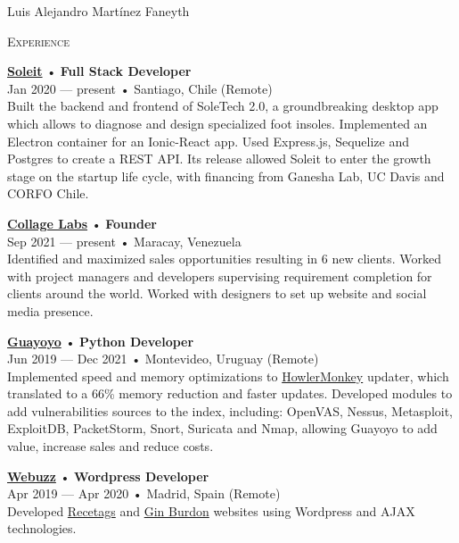 \documentclass[12pt]{article}
\begin{document}
\begin{cv}{Luis Alejandro Mart\'inez Faneyth}
\begin{minipage}[t]{0.55\textwidth}
    \textrm{\textsc{\Large{Experience}}}
    \newline
    \parbox[t]{\linewidth}{
      \textbf{\href{http://soleit.app}{Soleit}} • \textrm{\textbf{Full Stack Developer}}\\
      Jan 2020 --- present • Santiago, Chile (Remote)\\
      \footnotesize{Built the backend and frontend of SoleTech 2.0, a groundbreaking desktop app which allows to diagnose and design specialized foot insoles. Implemented an Electron container for an Ionic-React app. Used Express.js, Sequelize and Postgres to create a REST API. Its release allowed Soleit to enter the growth stage on the startup life cycle, with financing from Ganesha Lab, UC Davis and CORFO Chile.}\\
    }\vspace{0.125em}
    \parbox[t]{\linewidth}{
      \textbf{\href{http://collagelabs.org}{Collage Labs}} • \textrm{\textbf{Founder}}\\
      Sep 2021 --- present • Maracay, Venezuela\\
      \footnotesize{Identified and maximized sales opportunities resulting in 6 new clients. Worked with project managers and developers supervising requirement completion for clients around the world. Worked with designers to set up website and social media presence.}\\
    }\vspace{0.125em}
    \parbox[t]{\linewidth}{
      \textbf{\href{https://guayoyo.io}{Guayoyo}} • \textrm{\textbf{Python Developer}}\\
      Jun 2019 --- Dec 2021 • Montevideo, Uruguay (Remote)\\
      \footnotesize{Implemented speed and memory optimizations to \href{https://howlermonkey.io}{HowlerMonkey} updater, which translated to a 66\% memory reduction and faster updates. Developed modules to add vulnerabilities sources to the index, including: OpenVAS, Nessus, Metasploit, ExploitDB, PacketStorm, Snort, Suricata and Nmap, allowing Guayoyo to add value, increase sales and reduce costs.}\\
    }\vspace{0.125em}
    \parbox[t]{\linewidth}{
      \textbf{\href{https://web.archive.org/web/20180413143616/https://webuzz.es/}{Webuzz}} • \textrm{\textbf{Wordpress Developer}}\\
      Apr 2019 --- Apr 2020 • Madrid, Spain (Remote)\\
      \footnotesize{Developed \href{https://recetags.com}{Recetags} and \href{https://ginburdon.com}{Gin Burdon} websites using Wordpress and AJAX technologies.}\\
}
\end{minipage}
\end{cv}
\end{document}
